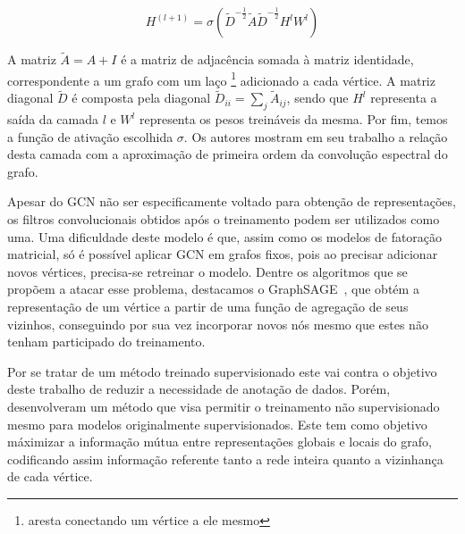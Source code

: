 \begin{equation} \label{eq:gcn_layer}
    H^{(l+1)} = \sigma (\tilde{D}^{-\frac{1}{2}} \tilde{A} \tilde{D}^{-\frac{1}{2}} H^l W^l)
\end{equation}

A matriz $\tilde{A} = A + I$ é a matriz de adjacência somada à matriz
identidade, correspondente a um grafo com um laço \footnote{aresta conectando um
vértice a ele mesmo} adicionado a cada vértice.
A matriz diagonal $\tilde{D}$ é composta pela diagonal
$\tilde{D}_{ii} = \sum_{j}\tilde{A}_{ij}$, sendo que $H^l$ representa a saída da
camada $l$ e $W^l$ representa os pesos treináveis da mesma.
Por fim, temos a função de ativação escolhida $\sigma$.
Os autores mostram em seu trabalho a relação desta camada com a aproximação de
primeira ordem da convolução espectral do grafo.

Apesar do GCN não ser especificamente voltado para obtenção de representações,
os filtros convolucionais obtidos após o treinamento podem ser utilizados como
uma.
Uma dificuldade deste modelo é que, assim como os modelos de fatoração matricial,
só é possível aplicar GCN em grafos fixos, pois ao precisar adicionar novos vértices,
precisa-se retreinar o modelo.
Dentre os algoritmos que se propõem a atacar esse problema, destacamos o
GraphSAGE~\cite{hamilton17}, que obtém a representação de um vértice a partir
de uma função de agregação de seus vizinhos, conseguindo por sua vez incorporar
novos nós mesmo que estes não tenham participado do treinamento.

Por se tratar de um método treinado supervisionado este vai contra o
objetivo deste trabalho de reduzir a necessidade de anotação de dados.
Porém, \citet{velickovic18} desenvolveram um método que visa permitir o
treinamento não supervisionado mesmo para modelos originalmente supervisionados.
Este tem como objetivo máximizar a informação mútua entre representações globais e
locais do grafo, codificando assim informação referente tanto a rede inteira
quanto a vizinhança de cada vértice.
